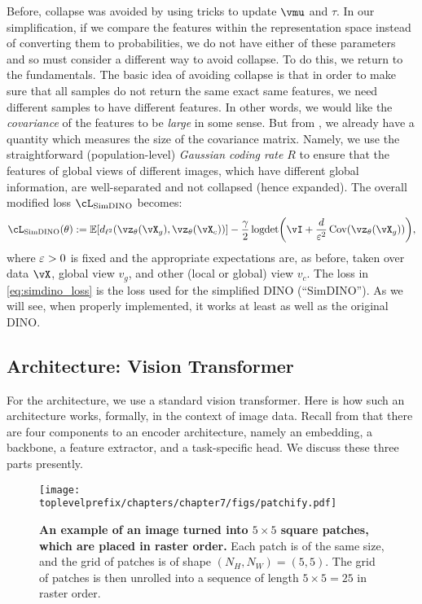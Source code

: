 \documentclass[../../book-main.tex]{subfiles}
\begin{document}
Before, collapse was avoided by using tricks to update \(\vmu\) and \(\tau\). In our simplification, if we compare the features within the representation space instead of converting them to probabilities, we do not have either of these parameters and so must consider a different way to avoid collapse. To do this, we return to the fundamentals. The basic idea of avoiding collapse is that in order to make sure that all samples do not return the same exact same features, we need different samples to have different features. In other words, we would like the \textit{covariance} of the features to be \textit{large} in some sense. But from , we already have a quantity which measures the size of the covariance matrix. Namely, we use the straightforward (population-level) \textit{Gaussian coding rate} \(R\) to ensure that the features of global views of different images, which have different global information, are well-separated and not collapsed (hence expanded). The overall modified loss \(\cL_{\simdino}\) becomes:
\begin{equation}\label{eq:simdino_loss}
    \cL_{\simdino}(\theta) := \Ex[d_{\ell^{2}}(\vz_{\theta}(\vX_{g}), \vz_{\theta}(\vX_{c}))] - \frac{\gamma}{2}\logdet\rp{\vI + \frac{d}{\eps^{2}}\Cov(\vz_{\theta}(\vX_{g}))},
\end{equation}
where \(\varepsilon > 0\) is fixed and the appropriate expectations are, as before, taken over data \(\vX\), global view \(v_{g}\), and other (local or global) view \(v_{c}\). The loss in \eqref{eq:simdino_loss} is the loss used for the simplified DINO (``SimDINO''). As we will see, when properly implemented, it works at least as well as the original DINO.

\subsection{Architecture: Vision Transformer}\label{sub:contrastive_learning_architecture}

For the architecture, we use a standard vision transformer. Here is how such an architecture works, formally, in the context of image data. Recall from  that there are four components to an encoder architecture, namely an embedding, a backbone, a feature extractor, and a task-specific head. We discuss these three parts presently.

\begin{figure}
    \centering 
    \texttt{[image: \\toplevelprefix/chapters/chapter7/figs/patchify.pdf]}
    \caption{\small\textbf{An example of an image turned into \(5 \times 5\) square patches, which are placed in raster order.} Each patch is of the same size, and the grid of patches is of shape \((N_{H}, N_{W}) = (5, 5)\). The grid of patches is then unrolled into a sequence of length \(5 \times 5 = 25\) in raster order.}
    \label{fig:patchify_rasterize}
\end{figure}
\end{document}
